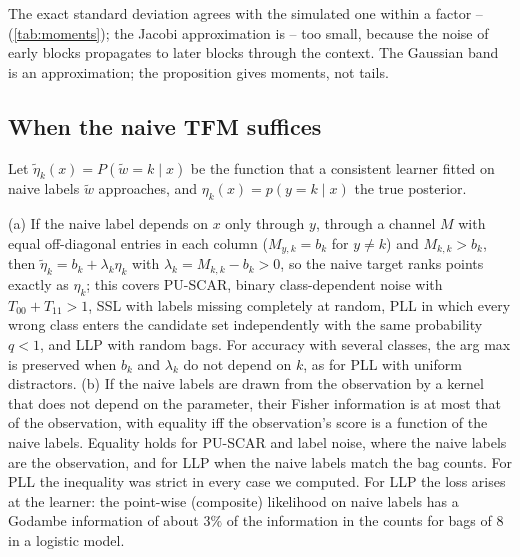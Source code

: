 \begin{table}[h]
\centering
\caption{ against simulation with the actual sampler and a synthetic TFM with a known affine response
map (PLL, $C=10$, $q=0.6$, $K=10$; per-point offsets with $h_{\max}=0.02$, which the proposition ignores). ``Jacobi'':
the approximation that treats all blocks of a sweep as seeing the same context.}
\label{tab:moments}
\small
\resizebox{\textwidth}{!}{}
\end{table}
The exact standard deviation agrees with the simulated one within a factor --
(\cref{tab:moments}); the Jacobi approximation is -- too small, because the
noise of early blocks propagates to later blocks through the context. The Gaussian band is an approximation; the
proposition gives moments, not tails.

\subsection{When the naive TFM suffices}
Let $\tilde\eta_k(x)=P(\tilde w=k\mid x)$ be the function that a consistent learner fitted on naive labels $\tilde w$
approaches, and $\eta_k(x)=p(y=k\mid x)$ the true posterior.
\begin{proposition}\label{prop:naive}
(a) If the naive label depends on $x$ only through $y$, through a channel $M$ with equal off-diagonal entries in each
column ($M_{y,k}=b_k$ for $y\neq k$) and $M_{k,k}>b_k$, then $\tilde\eta_k=b_k+\lambda_k\eta_k$ with
$\lambda_k=M_{k,k}-b_k>0$, so the naive target ranks points exactly as $\eta_k$; this covers PU-SCAR, binary
class-dependent noise with $T_{00}+T_{11}>1$, SSL with labels missing completely at random, PLL in which every wrong
class enters the candidate set independently with the same probability $q<1$, and LLP with random bags. For accuracy
with several classes, the arg max is preserved when $b_k$ and $\lambda_k$ do not depend on $k$, as for PLL with uniform
distractors. (b) If the naive labels are drawn from the observation by a kernel that does not depend on the parameter,
their Fisher information is at most that of the observation, with equality iff the observation's score is a function of
the naive labels. Equality holds for PU-SCAR and label noise, where the naive labels are the observation, and for LLP
when the naive labels match the bag counts. For PLL the inequality was strict in every case we computed. For LLP the
loss arises at the learner: the point-wise (composite) likelihood on naive labels has a Godambe information of about
$3\%$ of the information in the counts for bags of 8 in a logistic model.
\end{proposition}
